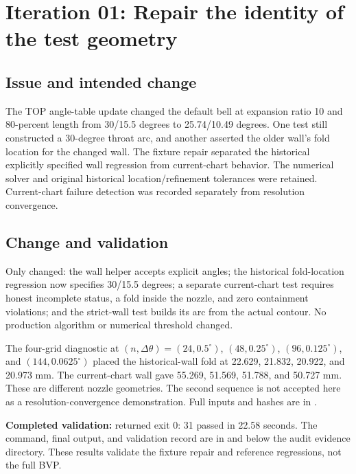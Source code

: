 \section{Iteration 01: Repair the identity of the test geometry}
\subsection{Issue and intended change}
The TOP angle-table update changed the default bell at expansion ratio 10 and
80-percent length from 30/15.5 degrees to 25.74/10.49 degrees. One test still
constructed a 30-degree throat arc, and another asserted the older wall's fold
location for the changed wall. The fixture repair separated the historical
explicitly specified wall regression from current-chart behavior.
The numerical solver and original historical location/refinement tolerances
were retained. Current-chart failure detection was recorded separately from
resolution convergence.

\subsection{Change and validation}
Only  changed: the wall helper accepts
explicit angles; the historical fold-location regression now specifies
30/15.5 degrees; a separate current-chart test requires honest incomplete status,
a fold inside the nozzle, and zero containment violations; and the strict-wall
test builds its arc from the actual contour. No production algorithm or
numerical threshold changed.

The four-grid diagnostic at $(n,\Delta\theta)=(24,0.5^\circ)$,
$(48,0.25^\circ)$, $(96,0.125^\circ)$, and $(144,0.0625^\circ)$ placed the
historical-wall fold at 22.629, 21.832, 20.922, and 20.973 mm. The current-chart
wall gave 55.269, 51.569, 51.788, and 50.727 mm. These are different nozzle
geometries. The second sequence is not accepted here as a resolution-convergence
demonstration. Full inputs and hashes are in
.

\textbf{Completed validation:}
returned exit 0: 31 passed in 22.58 seconds. The command, final output, and
validation record are in  and
 below the audit evidence directory. These results
validate the fixture repair and reference regressions, not the full BVP.

